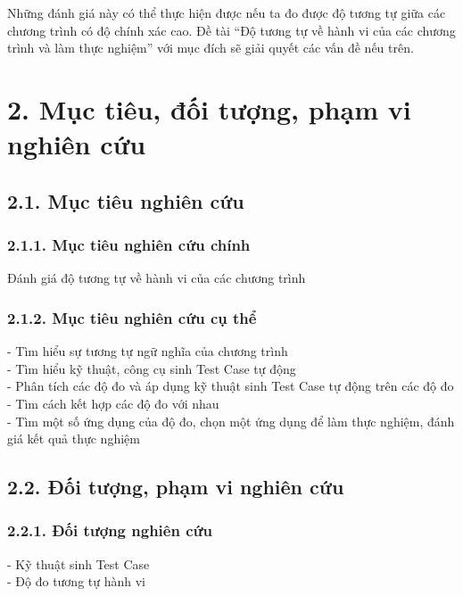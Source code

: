 Những đánh giá này có thể thực hiện được nếu ta đo được độ tương tự giữa các chương trình có độ chính xác cao. Đề tài “Độ tương tự về hành vi của các chương trình và làm thực nghiệm” với mục đích sẽ giải quyết các vấn đề nếu trên.

\section*{2. Mục tiêu, đối tượng, phạm vi nghiên cứu}

\subsection*{2.1. Mục tiêu nghiên cứu}

\subsubsection*{2.1.1. Mục tiêu nghiên cứu chính}
Đánh giá độ tương tự về hành vi của các chương trình

\subsubsection*{2.1.2. Mục tiêu nghiên cứu cụ thể}
- Tìm hiểu sự tương tự ngữ nghĩa của chương trình\\

- Tìm hiểu kỹ thuật, công cụ sinh Test Case tự động \\

- Phân tích các độ đo và áp dụng kỹ thuật sinh Test Case tự động trên các độ đo\\

- Tìm cách kết hợp các độ đo với nhau\\

- Tìm một số ứng dụng của độ đo, chọn một ứng dụng để làm thực nghiệm, đánh giá kết quả thực nghiệm\\

\subsection*{2.2. Đối tượng, phạm vi nghiên cứu}

\subsubsection*{2.2.1. Đối tượng nghiên cứu}	
- Kỹ thuật sinh Test Case \\

- Độ đo tương tự hành vi \\

